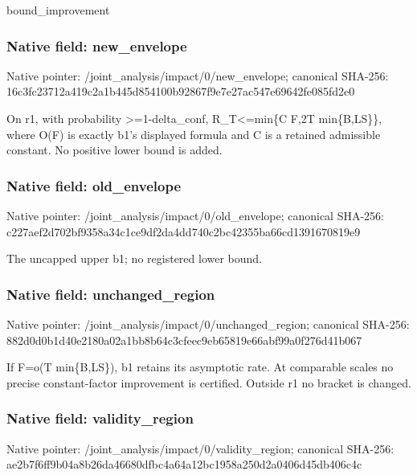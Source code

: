\documentclass[10pt,a4paper]{article}
\begin{document}
\begingroup\raggedright\sloppy bound\_\allowbreak{}improvement\par\endgroup

\subsubsection{Native field: new\_\allowbreak{}envelope}
Native pointer: /joint\_\allowbreak{}analysis/impact/0/new\_\allowbreak{}envelope; canonical SHA-256: 16c3fc23712a419c2a1b445d854100b92867f9e7e27ac547e69642fe085fd2e0

\begingroup\raggedright\sloppy On r1,\allowbreak{} with probability >=\allowbreak{}1-delta\_\allowbreak{}conf,\allowbreak{} R\_\allowbreak{}T<=\allowbreak{}min\{C F,\allowbreak{}2T min\{B,\allowbreak{}LS\}\},\allowbreak{} where O(F) is exactly b1's displayed formula and C is a retained admissible constant. No positive lower bound is added.\par\endgroup

\subsubsection{Native field: old\_\allowbreak{}envelope}
Native pointer: /joint\_\allowbreak{}analysis/impact/0/old\_\allowbreak{}envelope; canonical SHA-256: c227aef2d702bf9358a34c1ce9df2da4dd740c2bc42355ba66cd1391670819e9

\begingroup\raggedright\sloppy The uncapped upper b1;\allowbreak{} no registered lower bound.\par\endgroup

\subsubsection{Native field: unchanged\_\allowbreak{}region}
Native pointer: /joint\_\allowbreak{}analysis/impact/0/unchanged\_\allowbreak{}region; canonical SHA-256: 882d0d0b1d40e2180a02a1bb8b64c3cfeec9eb65819e66abf99a0f276d41b067

\begingroup\raggedright\sloppy If F=\allowbreak{}o(T min\{B,\allowbreak{}LS\}),\allowbreak{} b1 retains its asymptotic rate. At comparable scales no precise constant-factor improvement is certified. Outside r1 no bracket is changed.\par\endgroup

\subsubsection{Native field: validity\_\allowbreak{}region}
Native pointer: /joint\_\allowbreak{}analysis/impact/0/validity\_\allowbreak{}region; canonical SHA-256: ae2b7f6ff9b04a8b26da46680dfbc4a64a12bc1958a250d2a0406d45db406c4c
\end{document}
